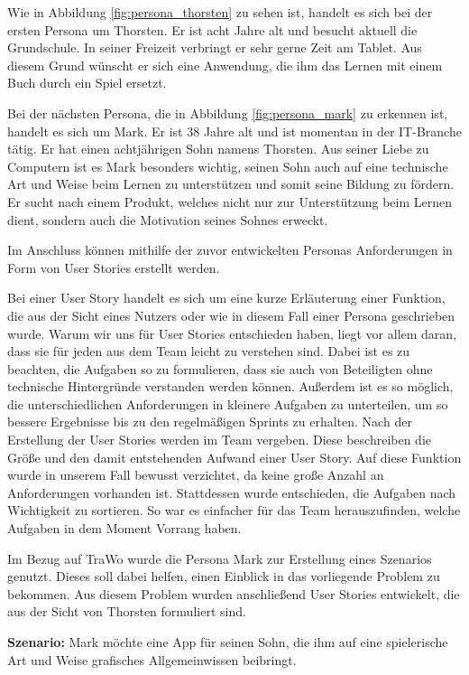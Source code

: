 Wie in Abbildung \ref{fig:persona_thorsten} zu sehen ist, handelt es sich bei der ersten Persona um Thorsten. Er ist acht Jahre alt und besucht aktuell die Grundschule. In seiner Freizeit verbringt er sehr gerne Zeit am Tablet. Aus diesem Grund wünscht er sich eine Anwendung, die ihm das Lernen mit einem Buch durch ein Spiel ersetzt.

Bei der nächsten Persona, die in Abbildung \ref{fig:persona_mark} zu erkennen ist, handelt es sich um Mark. Er ist 38 Jahre alt und ist momentan in der IT-Branche tätig. Er hat einen achtjährigen Sohn namens Thorsten. Aus seiner Liebe zu Computern ist es Mark besonders wichtig, seinen Sohn auch auf eine technische Art und Weise beim Lernen zu unterstützen und somit seine Bildung zu fördern. Er sucht nach einem Produkt, welches nicht nur zur Unterstützung beim Lernen dient, sondern auch die Motivation seines Sohnes erweckt.

Im Anschluss können mithilfe der zuvor entwickelten Personas Anforderungen in Form von User Stories erstellt werden.

Bei einer User Story handelt es sich um eine kurze Erläuterung einer Funktion, die aus der Sicht eines Nutzers oder wie in diesem Fall einer Persona geschrieben wurde. Warum wir uns für User Stories entschieden haben, liegt vor allem daran, dass sie für jeden aus dem Team leicht zu verstehen sind. Dabei ist es zu beachten, die Aufgaben so zu formulieren, dass sie auch von Beteiligten ohne technische Hintergründe verstanden werden können. Außerdem ist es so möglich, die unterschiedlichen Anforderungen in kleinere Aufgaben zu unterteilen, um so bessere Ergebnisse bis zu den regelmäßigen Sprints zu erhalten. Nach der Erstellung der User Stories werden im Team  vergeben. Diese beschreiben die Größe und den damit entstehenden Aufwand einer User Story. Auf diese Funktion wurde in unserem Fall bewusst verzichtet, da keine große Anzahl an Anforderungen vorhanden ist. Stattdessen wurde entschieden, die Aufgaben nach Wichtigkeit zu sortieren. So war es einfacher für das Team herauszufinden, welche Aufgaben in dem Moment Vorrang haben. 

Im Bezug auf TraWo wurde die Persona Mark zur Erstellung eines Szenarios genutzt. Dieses soll dabei helfen, einen Einblick in das vorliegende Problem zu bekommen. Aus diesem Problem wurden anschließend User Stories entwickelt, die aus der Sicht von Thorsten formuliert sind.

\textbf{Szenario:}
Mark möchte eine App für seinen Sohn, die ihm auf eine spielerische Art und Weise grafisches Allgemeinwissen beibringt.

